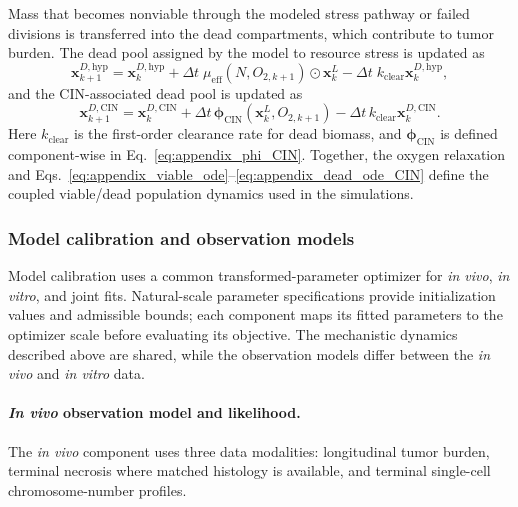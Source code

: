 \documentclass[11pt]{article}
\begin{document}
Mass that becomes nonviable through the modeled stress pathway or failed divisions is transferred into the dead compartments, which contribute to tumor burden. The dead pool assigned by the model to resource stress is updated as
\begin{equation}
\mathbf{x}^{D,\mathrm{hyp}}_{k+1}
=
\mathbf{x}^{D,\mathrm{hyp}}_{k}
+
\Delta t\;\mu_{\mathrm{eff}}(N,O_{2,k+1})\odot\mathbf{x}^{L}_{k}
-
\Delta t\;k_{\mathrm{clear}}\mathbf{x}^{D,\mathrm{hyp}}_{k},
\label{eq:appendix_dead_ode_hyp}
\end{equation}
and the CIN-associated dead pool is updated as
\begin{equation}
\mathbf{x}^{D,\mathrm{CIN}}_{k+1} = \mathbf{x}^{D,\mathrm{CIN}}_{k} + \Delta t \, \boldsymbol{\phi}_{\mathrm{CIN}}(\mathbf{x}^{L}_{k},O_{2,k+1}) - \Delta t \, k_{\mathrm{clear}}\mathbf{x}^{D,\mathrm{CIN}}_{k}.
\label{eq:appendix_dead_ode_CIN}
\end{equation}
Here $k_{\mathrm{clear}}$ is the first-order clearance rate for dead biomass, and $\boldsymbol{\phi}_{\mathrm{CIN}}$ is defined component-wise in Eq.~\eqref{eq:appendix_phi_CIN}. Together, the oxygen relaxation and Eqs.~\eqref{eq:appendix_viable_ode}--\eqref{eq:appendix_dead_ode_CIN} define the coupled viable/dead population dynamics used in the simulations.

\subsubsection{Model calibration and observation models}

Model calibration uses a common transformed-parameter optimizer for \textit{in vivo}, \textit{in vitro}, and joint fits. Natural-scale parameter specifications provide initialization values and admissible bounds; each component maps its fitted parameters to the optimizer scale before evaluating its objective. The mechanistic dynamics described above are shared, while the observation models differ between the \textit{in vivo} and \textit{in vitro} data.

\paragraph{\textit{In vivo} observation model and likelihood.}

The \textit{in vivo} component uses three data modalities: longitudinal tumor burden, terminal necrosis where matched histology is available, and terminal single-cell chromosome-number profiles.
\end{document}
